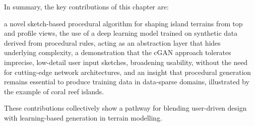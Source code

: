 In summary, the key contributions of this chapter are:
\begin{Itemize}
    \Item{} a novel sketch-based procedural algorithm for shaping island terrains from top and profile views,
    \Item{} the use of a deep learning model trained on synthetic data derived from procedural rules, acting as an abstraction layer that hides underlying complexity,
    \Item{} a demonstration that the cGAN approach tolerates imprecise, low-detail user input sketches, broadening usability, without the need for cutting-edge network architectures,
    \Item{} and an insight that procedural generation remains essential to produce training data in data-sparse domains, illustrated by the example of coral reef islands.
\end{Itemize}
These contributions collectively show a pathway for blending user-driven design with learning-based generation in terrain modelling.















